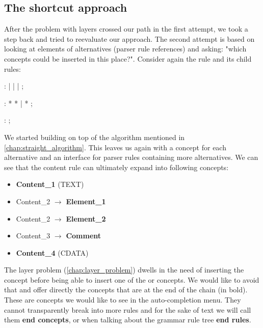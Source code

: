 \subsection{The shortcut approach}
\label{chap:shortcut_approach}

After the problem with layers crossed our path in the first attempt, we took a step back and tried to reevaluate our approach.
The second attempt is based on looking at elements of alternatives (parser rule references) and asking: "which concepts could be inserted in this place?".
Consider again the  rule and its child rules:

\begin{antlr}
	    :   
           |   
           |   
           |   
           ;

	    :   \literal{<}  * \literal{>} * \literal{</}  \literal{>}
           |   \literal{<}  * \literal{/>}
           ;

	    :   \literal{<!--}  \literal{-->} ;
\end{antlr}

We started building on top of the algorithm mentioned in \ref{chap:straight_algorithm}.
This leaves us again with a concept for each alternative and an interface for parser rules containing more alternatives.
We can see that the content rule can ultimately expand into following concepts:

\begin{itemize}
	\item \textbf{Content{\_}1} (TEXT)
	\item Content{\_}2 $\rightarrow$ \textbf{Element{\_}1}
	\item Content{\_}2 $\rightarrow$ \textbf{Element{\_}2}
	\item Content{\_}3 $\rightarrow$ \textbf{Comment}
	\item \textbf{Content{\_}4} (CDATA)
\end{itemize}

The layer problem (\ref{chap:layer_problem}) dwells in the need of inserting the  concept before being able to insert one of the  or  concepts.
We would like to avoid that and offer directly the concepts that are at the end of the chain (in bold).
These are concepts we would like to see in the auto-completion menu.
They cannot transparently break into more rules and for the sake of text we will call them \textbf{end concepts}, or when talking about the grammar rule tree \textbf{end rules}. 
\\

